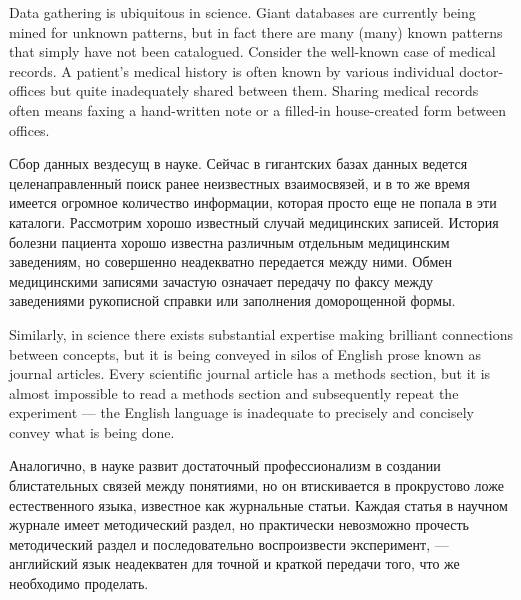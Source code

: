 \documentclass[CT4S-EN-RU]{subfiles}
\begin{document}
\begin{blockENG}
Data gathering is ubiquitous in science. Giant databases are currently being mined for unknown patterns, but in fact there are many (many) known patterns that simply have not been catalogued. Consider the well-known case of medical records. A patient's medical history is often known by various individual doctor-offices but quite inadequately shared between them. Sharing medical records often means faxing a hand-written note or a filled-in house-created form between offices.
\end{blockENG}

\begin{blockRUS}
Сбор данных вездесущ в науке. Сейчас в гигантских базах данных ведется целенаправленный поиск ранее неизвестных взаимосвязей, и в то же время имеется огромное количество информации, которая просто еще не попала в эти каталоги. Рассмотрим хорошо известный случай медицинских записей. История болезни пациента хорошо известна различным отдельным медицинским заведениям, но совершенно неадекватно передается между ними. Обмен медицинскими записями зачастую означает передачу по факсу между заведениями рукописной справки или заполнения доморощенной формы. 
\end{blockRUS}

\begin{blockENG}
Similarly, in science there exists substantial expertise making brilliant connections between concepts, but it is being conveyed in silos of English prose known as journal articles. Every scientific journal article has a methods section, but it is almost impossible to read a methods section and subsequently repeat the experiment — the English language is inadequate to precisely and concisely convey what is being done.
\end{blockENG}

\begin{blockRUS}
Аналогично, в науке развит достаточный профессионализм в создании блистательных связей между понятиями, но он втискивается в прокрустово ложе естественного языка, известное как журнальные статьи. Каждая статья в научном журнале имеет методический раздел, но практически невозможно прочесть методический раздел и последовательно воспроизвести эксперимент, — английский язык неадекватен для точной и краткой передачи того, что же необходимо проделать. 
\end{blockRUS}
\end{document}
